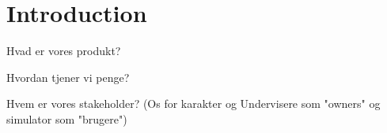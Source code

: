 \section{Introduction}


Hvad er vores produkt?

Hvordan tjener vi penge?

Hvem er vores stakeholder? (Os for karakter og Undervisere som "owners" og simulator som "brugere")



